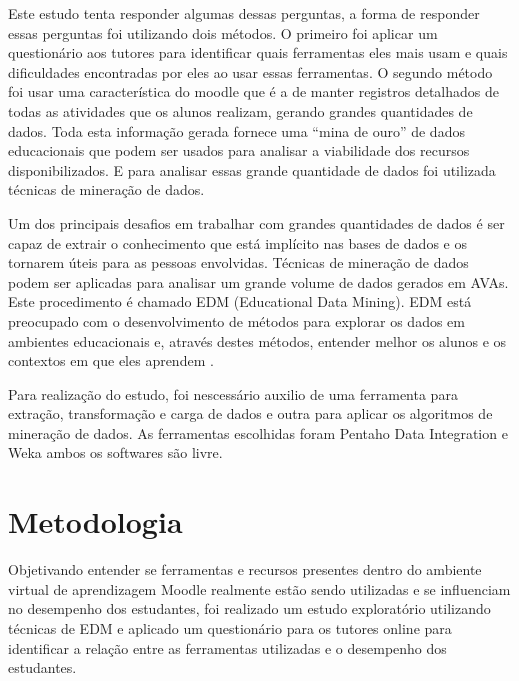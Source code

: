 \documentclass[12pt]{article}
\begin{document}
Este estudo tenta responder algumas dessas perguntas, a forma de responder essas perguntas foi utilizando dois métodos. O primeiro foi aplicar um questionário aos tutores para identificar quais ferramentas eles mais usam e quais dificuldades encontradas por eles ao usar essas ferramentas. O segundo método foi usar uma característica do moodle que é a de manter registros detalhados de todas as atividades que os alunos realizam, gerando grandes quantidades de dados. Toda esta informação gerada fornece uma ``mina de ouro'' de dados educacionais que podem ser usados para analisar a viabilidade dos recursos disponibilizados. E para analisar essas grande quantidade de dados foi utilizada técnicas de mineração de dados.  

Um dos principais desafios em trabalhar com grandes quantidades de dados é ser capaz de extrair o conhecimento que está implícito nas bases de dados e os tornarem úteis para as pessoas envolvidas. Técnicas de mineração de dados podem ser aplicadas para analisar um grande volume de dados gerados em AVAs. Este procedimento é chamado EDM (Educational Data Mining). EDM está preocupado com o desenvolvimento de métodos para explorar os dados em ambientes educacionais e, através destes métodos, entender melhor os alunos e os contextos em que eles aprendem \cite{baker2010data}.

Para realização do estudo, foi nescessário auxilio de uma ferramenta para extração, transformação e carga de dados e outra para aplicar os algoritmos de mineração de dados. As ferramentas escolhidas foram Pentaho Data Integration e Weka ambos os softwares são livre.

\section{Metodologia}

Objetivando entender se ferramentas e recursos presentes dentro do ambiente virtual de aprendizagem Moodle realmente estão sendo utilizadas e se influenciam no desempenho dos estudantes, foi realizado um estudo exploratório utilizando técnicas de EDM e aplicado um questionário para os tutores online para identificar a relação entre as ferramentas utilizadas e o desempenho dos estudantes. 
\end{document}

